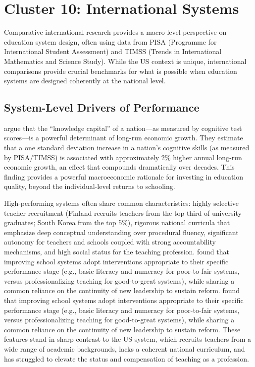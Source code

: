 \documentclass[12pt,letterpaper]{article}
\begin{document}
\section{Cluster 10: International Systems}

Comparative international research provides a macro-level perspective on education system design, often using data from PISA (Programme for International Student Assessment) and TIMSS (Trends in International Mathematics and Science Study). While the US context is unique, international comparisons provide crucial benchmarks for what is possible when education systems are designed coherently at the national level.

\subsection{System-Level Drivers of Performance}

\citet{hanushek2015} argue that the ``knowledge capital'' of a nation---as measured by cognitive test scores---is a powerful determinant of long-run economic growth. They estimate that a one standard deviation increase in a nation's cognitive skills (as measured by PISA/TIMSS) is associated with approximately 2\% higher annual long-run economic growth, an effect that compounds dramatically over decades. This finding provides a powerful macroeconomic rationale for investing in education quality, beyond the individual-level returns to schooling.

High-performing systems often share common characteristics: highly selective teacher recruitment (Finland recruits teachers from the top third of university graduates; South Korea from the top 5\%), rigorous national curricula that emphasize deep conceptual understanding over procedural fluency, significant autonomy for teachers and schools coupled with strong accountability mechanisms, and high social status for the teaching profession. \citet{mourshed2010} found that improving school systems adopt interventions appropriate to their specific performance stage (e.g., basic literacy and numeracy for poor-to-fair systems, versus professionalizing teaching for good-to-great systems), while sharing a common reliance on the continuity of new leadership to sustain reform. \citet{mourshed2010} found that improving school systems adopt interventions appropriate to their specific performance stage (e.g., basic literacy and numeracy for poor-to-fair systems, versus professionalizing teaching for good-to-great systems), while sharing a common reliance on the continuity of new leadership to sustain reform. These features stand in sharp contrast to the US system, which recruits teachers from a wide range of academic backgrounds, lacks a coherent national curriculum, and has struggled to elevate the status and compensation of teaching as a profession.
\end{document}
